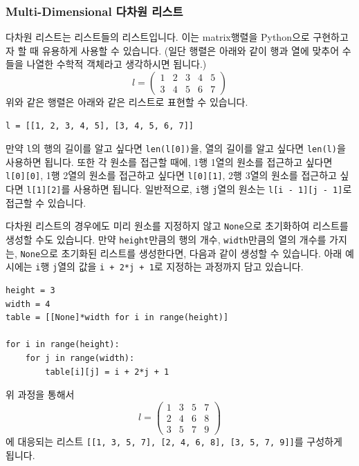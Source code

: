\documentclass[../main.tex]{subfiles}
\begin{document}
\subsubsection{Multi-Dimensional 다차원 리스트}
다차원 리스트는 리스트들의 리스트입니다.
이는 matrix행렬을 Python으로 구현하고자 할 때 유용하게 사용할 수 있습니다.
(일단 행렬은 아래와 같이 행과 열에 맞추어 수들을 나열한 수학적 객체라고 생각하시면 됩니다.)
\[
l =
  \begin{pmatrix}
    1 & 2 & 3 & 4 & 5 \\
    3 & 4 & 5 & 6 & 7
  \end{pmatrix}
\]
위와 같은 행렬은 아래와 같은 리스트로 표현할 수 있습니다.
\begin{verbatim}
l = [[1, 2, 3, 4, 5], [3, 4, 5, 6, 7]]
\end{verbatim}
만약 \texttt{l}의 행의 길이를 알고 싶다면 \texttt{len(l[0])}을, 열의 길이를 알고 싶다면 \texttt{len(l)}을 사용하면 됩니다.
또한 각 원소를 접근할 때에, 1행 1열의 원소를 접근하고 싶다면 \texttt{l[0][0]}, 1행 2열의 원소를 접근하고 싶다면 \texttt{l[0][1]}, 2행 3열의 원소를 접근하고 싶다면 \texttt{l[1][2]}를 사용하면 됩니다.
일반적으로, \texttt{i}행 \texttt{j}열의 원소는 \texttt{l[i - 1][j - 1]}로 접근할 수 있습니다.

다차원 리스트의 경우에도 미리 원소를 지정하지 않고 \texttt{None}으로 초기화하여 리스트를 생성할 수도 있습니다.
만약 \texttt{height}만큼의 행의 개수, \texttt{width}만큼의 열의 개수를 가지는, \texttt{None}으로 초기화된 리스트를 생성한다면, 다음과 같이 생성할 수 있습니다.
아래 예시에는 \texttt{i}행 \texttt{j}열의 값을 \texttt{i + 2*j + 1}로 지정하는 과정까지 담고 있습니다.
\begin{verbatim}
height = 3
width = 4
table = [[None]*width for i in range(height)]

for i in range(height):
    for j in range(width):
        table[i][j] = i + 2*j + 1
\end{verbatim}
위 과정을 통해서 
\[
l =
  \begin{pmatrix}
    1 & 3 & 5 & 7\\
    2 & 4 & 6 & 8\\
    3 & 5 & 7 & 9
  \end{pmatrix}
\]
에 대응되는 리스트 \texttt{[[1, 3, 5, 7], [2, 4, 6, 8], [3, 5, 7, 9]]}를 구성하게 됩니다.
\end{document}
